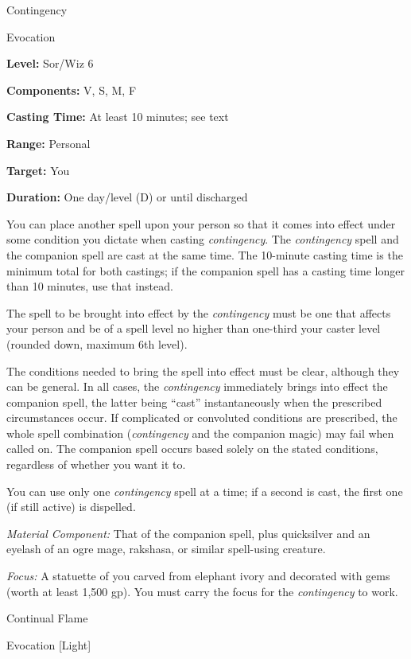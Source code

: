 \documentclass{article}
\begin{document}
\vspace{12pt}
Contingency

Evocation

\textbf{Level:} Sor/Wiz 6

\textbf{Components:} V, S, M, F

\textbf{Casting Time:} At least 10 minutes; see text

\textbf{Range:} Personal

\textbf{Target:} You

\textbf{Duration:} One day/level (D) or until discharged

You can place another spell upon your person so that it comes into effect under 
some condition you dictate when casting \textit{contingency}. The \textit{contingency 
}spell and the companion spell are cast at the same time. The 10-minute casting 
time is the minimum total for both castings; if the companion spell has a casting 
time longer than 10 minutes, use that instead.

The spell to be brought into effect by the \textit{contingency }must be one that 
affects your person and be of a spell level no higher than one-third your caster 
level (rounded down, maximum 6th level).

The conditions needed to bring the spell into effect must be clear, although they 
can be general. In all cases, the \textit{contingency }immediately brings into 
effect the companion spell, the latter being ``cast'' instantaneously when the 
prescribed circumstances occur. If complicated or convoluted conditions are prescribed, 
the whole spell combination (\textit{contingency }and the companion magic) may 
fail when called on. The companion spell occurs based solely on the stated conditions, 
regardless of whether you want it to.

You can use only one \textit{contingency }spell at a time; if a second is cast, 
the first one (if still active) is dispelled.

\textit{Material Component: }That of the companion spell, plus quicksilver and 
an eyelash of an ogre mage, rakshasa, or similar spell-using creature.

\textit{Focus: }A statuette of you carved from elephant ivory and decorated with 
gems (worth at least 1,500 gp). You must carry the focus for the \textit{contingency 
}to work.

\vspace{12pt}
Continual Flame

Evocation [Light]
\end{document}
